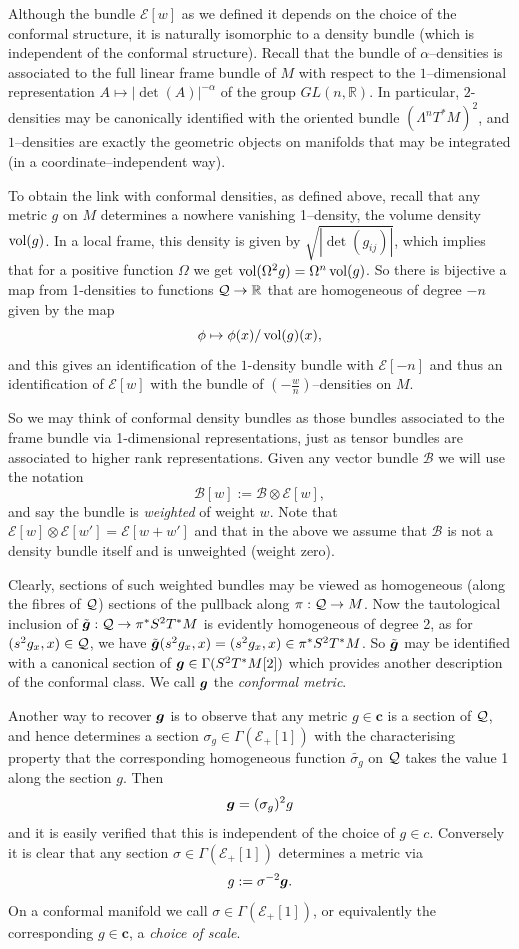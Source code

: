 \documentclass[a4paper,12pt]{amsart}
\def\Cal{\mathcal}
\newcommand{\cc}{\boldsymbol{c}}
\newcommand{\ce}{{\Cal E}}
\def\cB{\mathcal{B}}
\def\al{\alpha}
\def\ph{\phi}
\def\bg{\mbox{\boldmath $g$}}
\newcommand{\si}{\sigma}
\theoremstyle{remark}
\begin{document}
Although the bundle $\ce[w]$ as we defined it depends on the choice of
the conformal structure, it is naturally isomorphic to a density
bundle (which is independent of the conformal structure). Recall that
the bundle of $\al$--densities is associated to the full linear frame
bundle of $M$ with respect to the $1$--dimensional representation
$A\mapsto |\det(A)|^{-\al}$ of the group $GL(n,\mathbb{R})$. In
particular, $2$-densities may be canonically identified with the
oriented bundle $(\Lambda^nT^*M)^2$, and 
$1$--densities are exactly the
geometric objects on manifolds that may be integrated (in a coordinate--independent way).

 To obtain the link with conformal densities, as defined above, recall
that any  metric $g$ on $M$ determines a nowhere vanishing
1--density, the volume density $\operatorname{vol}(g)$. In a local frame, this
density is given by $\sqrt{|\det(g_{ij})|}$, which implies
that for a positive function $\Omega$ we get $\operatorname{vol}(\Omega^2g)=\Omega^n\operatorname{vol}(g)$.
So there is bijective a map from 1-densities to functions $\cq\to\mathbb{R}$ that are homogeneous of degree $-n$ given by the map 
$$
\phi\mapsto \ph(x)/\vol(g)(x),
$$
and this gives an
identification of the $1$-density bundle with $\ce[-n]$ and thus an
identification of $\ce[w]$ with the bundle of
$(-\frac{w}{n})$--densities on $M$. 

So we may think of conformal density bundles as those bundles
associated to the frame bundle via 1-dimensional representations, just
as tensor bundles are associated to higher rank representations. Given any vector bundle $\cB$ we will use the  notation
$$
\cB[w]:=\cB\otimes \ce[w],
$$
and say the bundle is {\em weighted} of weight $w$. Note that $\ce[w]\otimes\ce[w']= \ce[w+ w']$ and that in the above we assume that $\cB$ is not a density bundle itself and is unweighted (weight zero).


Clearly, sections of such weighted bundles may be viewed as homogeneous
(along the fibres of $\cq$) sections of the pullback along $\pi:
\cq\to M$. Now the tautological inclusion of
$\tilde{\bg}:\cq \to \pi^*S^2T^*M$ is evidently homogeneous of degree
2, as for $(s^2g_x,x)\in \cq$, we have $\tilde{\bg}(s^2g_x,x)=
(s^2g_x,x)\in\pi^*S^2T^*M$. So $\tilde{\bg}$ may be identified with a canonical
section of $ \bg\in \Gamma(S^2T^*M[2])$ which provides another
description of the conformal class.  We call $\bg$ the {\em conformal
  metric}. 

Another way to recover $\bg$ is to observe that any metric $g\in \cc$
is a section of $\cq$, and hence determines a section $\si_g\in
\Gamma(\ce_+[1])$ with the characterising property that the
corresponding homogeneous function $\tilde{\si_g}$ on $\cq$ takes the
value 1 along the section $g$. Then 
\begin{equation}\label{easybg}
\bg=(\si_g)^2g
\end{equation}
and it is easily
verified that this is independent of the choice of $g\in c$. Conversely it is clear that any section  $\si\in \Gamma(\ce_+[1])$ determines a metric via
$$ 
g:=\si^{-2}\bg.
$$ 
On a conformal manifold we call $\si\in \Gamma(\ce_+[1])$, or equivalently the corresponding $g\in \cc$, a {\em choice of scale}.
\end{document}
